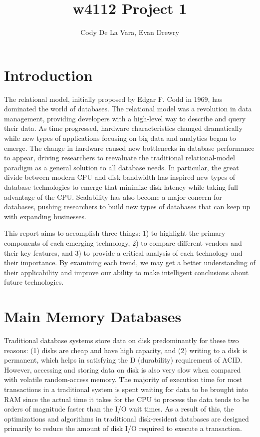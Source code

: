 \documentclass[11pt,a4paper]{report}
\author{Cody De La Vara, Evan Drewry}
\title{w4112 Project 1}
\begin{document}
\maketitle
\chapter{Introduction}
The relational model, initially proposed by Edgar F. Codd in 1969, has dominated the world of databases.\cite{cod70} The relational model was a revolution in data management, providing developers with a high-level way to describe and query their data. \cite{cod70} As time progressed, hardware characteristics changed dramatically while new types of applications focusing on big data and analytics began to emerge. The change in hardware caused new bottlenecks in database performance to appear, driving researchers to reevaluate the traditional relational-model paradigm as a general solution to all database needs. In particular, the great divide between modern CPU and disk bandwidth has inspired new types of database technologies to emerge that minimize disk latency while taking full advantage of the CPU. Scalability has also become a major concern for databases, pushing researchers to build new types of databases that can keep up with expanding businesses.

This report aims to accomplish three things: 1) to highlight the primary components of each emerging technology, 2) to compare different vendors and their key features, and 3) to provide a critical analysis of each technology and their importance.  By examining each trend, we may get a better understanding of their applicability and improve our ability to make intelligent conclusions about future technologies.

\chapter{Main Memory Databases}
Traditional database systems store data on disk predominantly for these two reasons: (1) disks are cheap and have high capacity, and (2) writing to a disk is permanent, which helps in satisfying the D (durability) requirement of ACID. However, accessing and storing data on disk is also very slow when compared with volatile random-access memory. The majority of execution time for most transactions in a traditional system is spent waiting for data to be brought into RAM since the actual time it takes for the CPU to process the data tends to be orders of magnitude faster than the I/O wait times. As a result of this, the optimizations and algorithms in traditional disk-resident databases are designed primarily to reduce the amount of disk I/O required to execute a transaction.
\end{document}
